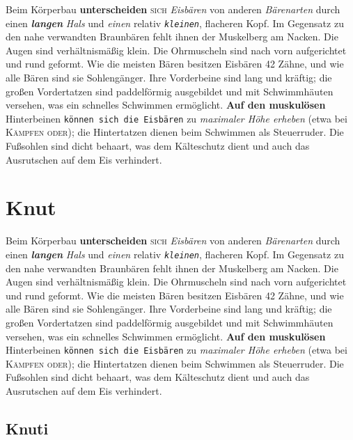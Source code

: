 \documentclass{article}
\begin{document}
\blindtext

Beim Körperbau \textbf{unterscheiden} \textsc{sich} \emph{Eisbären}
von \textsf{anderen} \textit{Bärenarten} durch einen
\textbf{\textit{langen}} \textsl{\textit{Hals}} und
\textsf{\textit{einen}} relativ \texttt{\textit{kleinen}}, {\Huge
  flacheren} {\tiny Kopf}. Im {\LARGE Gegensatz} zu den nahe
verwandten Braunbären fehlt ihnen der Muskelberg am Nacken. Die Augen
sind verhältnismäßig klein. Die Ohrmuscheln sind nach vorn
aufgerichtet und rund geformt. Wie die meisten Bären besitzen Eisbären
42 Zähne, und wie alle Bären sind sie Sohlengänger. Ihre Vorderbeine
sind lang und kräftig; die großen Vordertatzen sind paddelförmig
ausgebildet und mit Schwimmhäuten versehen, was ein schnelles
Schwimmen ermöglicht. \textbf{\Huge Auf den muskulösen} Hinterbeinen
\texttt{\tiny können sich die Eisbären} zu \textit{\LARGE maximaler Höhe erheben} (etwa
bei \textsc{\huge Kämpfen oder}); die Hintertatzen
dienen beim Schwimmen als Steuerruder. Die Fußsohlen sind dicht
behaart, was dem Kälteschutz dient und auch das Ausrutschen auf dem
Eis verhindert. 

\section{Knut}
\blindtext

Beim Körperbau \textbf{unterscheiden} \textsc{sich} \emph{Eisbären}
von \textsf{anderen} \textit{Bärenarten} durch einen
\textbf{\textit{langen}} \textsl{\textit{Hals}} und
\textsf{\textit{einen}} relativ \texttt{\textit{kleinen}}, {\Huge
  flacheren} {\tiny Kopf}. Im {\LARGE Gegensatz} zu den nahe
verwandten Braunbären fehlt ihnen der Muskelberg am Nacken. Die Augen
sind verhältnismäßig klein. Die Ohrmuscheln sind nach vorn
aufgerichtet und rund geformt. Wie die meisten Bären besitzen Eisbären
42 Zähne, und wie alle Bären sind sie Sohlengänger. Ihre Vorderbeine
sind lang und kräftig; die großen Vordertatzen sind paddelförmig
ausgebildet und mit Schwimmhäuten versehen, was ein schnelles
Schwimmen ermöglicht. \textbf{\Huge Auf den muskulösen} Hinterbeinen
\texttt{\tiny können sich die Eisbären} zu \textit{\LARGE maximaler Höhe erheben} (etwa
bei \textsc{\huge Kämpfen oder}); die Hintertatzen
dienen beim Schwimmen als Steuerruder. Die Fußsohlen sind dicht
behaart, was dem Kälteschutz dient und auch das Ausrutschen auf dem
Eis verhindert. 
\subsection{Knuti}
\blindtext
\end{document}
